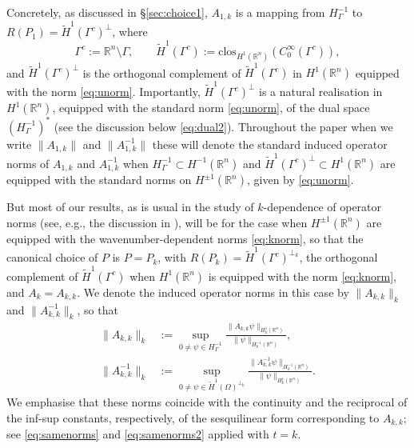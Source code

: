 \documentclass{birkjour}
\theoremstyle{definition}
\theoremstyle{remark}
\numberwithin{equation}{section}
\newcommand{\R}{\mathbb{R}}
\begin{document}
Concretely, as discussed in \S\ref{sec:choice1}, $A_{1,k}$ is a mapping from $H^{-1}_\Gamma$ to  $R(P_1) = \widetilde H^1(\Gamma^c)^\perp$, where 
\begin{equation} \label{eq:Omega*}
\Gamma^c := \R^n\setminus \Gamma, \qquad \widetilde H^1(\Gamma^c):= \text{clos}_{H^1(\R^n)}(C^{\infty}_0(\Gamma^c)),
\end{equation}
and  $\widetilde H^1(\Gamma^c)^\perp$ is the orthogonal complement of  $\widetilde H^1(\Gamma^c)$ in $H^1(\R^n)$ equipped with the norm \eqref{eq:unorm}. Importantly, $\widetilde H^1(\Gamma^c)^\perp$ is a natural realisation in $H^1(\R^n)$, equipped with the standard norm \eqref{eq:unorm}, of the dual space  $(H^{-1}_\Gamma)^*$ (see the discussion below \eqref{eq:dual2}). Throughout the paper when we write $\|A_{1,k}\|$ and $\|A_{1,k}^{-1}\|$ these will denote the standard induced operator norms of $A_{1,k}$ and $A_{1,k}^{-1}$ when $H_\Gamma^{-1}\subset H^{-1}(\R^n)$ and $\widetilde H^1(\Gamma^c)^\perp\subset H^1(\R^n)$ are equipped with the standard norms on $H^{\pm 1}(\R^n)$, given by \eqref{eq:unorm}.

But most of our results, as is usual in the study of $k$-dependence of operator norms (see, e.g., the discussion in \cite{CWHewett2015}), will be for the case when  $H^{\pm 1}(\R^n)$ are equipped with the wavenumber-dependent norms \eqref{eq:knorm}, so that the canonical choice of $P$ is $P=P_k$, with $R(P_k) = \widetilde H^1(\Gamma^c)^{\perp_k}$, the orthogonal complement of $\widetilde H^1(\Gamma^c)$ when $H^1(\R^n)$ is equipped with the norm \eqref{eq:knorm}, and  $A_k=A_{k,k}$. We denote the  induced  operator norms in this case by $\|A_{k,k}\|_k$ and $\|A_{k,k}^{-1}\|_k$, so that
\begin{align} \label{eq:Aknorm}
\|A_{k,k}\|_k  &:= \sup_{0\neq \psi\in H^{-1}_\Gamma}\frac{\|A_{k,k}\psi\|_{H^{1}_k(\R^n)}}{\|\psi\|_{H^{-1}_k(\R^n)}},\\ \label{eq:Aknorm2}
  \|A_{k,k}^{-1}\|_k &:= \sup_{0\neq \psi\in \widetilde H^1(\Omega)^{\perp_k}}\frac{\|A_{k,k}^{-1}\psi\|_{H^{-1}_k(\R^n)}}{\|\psi\|_{H^{1}_k(\R^n)}}.
\end{align}
We emphasise that these norms coincide with the continuity and the reciprocal of the inf-sup constants, respectively, of the sesquilinear form corresponding to $A_{k,k}$; see \eqref{eq:samenorms} and \eqref{eq:samenorms2} applied with $t=k$.
\end{document}
